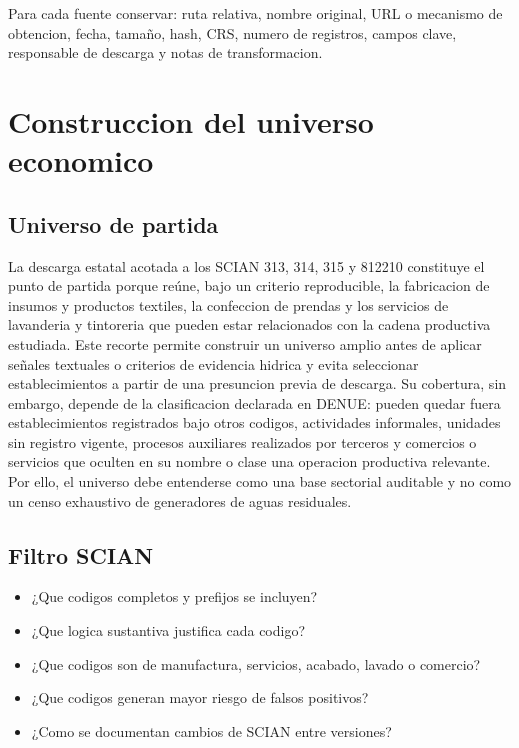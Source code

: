 \documentclass[11pt,letterpaper]{article}
\begin{document}
\begin{trazabilidad}
Para cada fuente conservar: ruta relativa, nombre original, URL o mecanismo de obtencion, fecha, tamaño, hash, CRS, numero de registros, campos clave, responsable de descarga y notas de transformacion.
\end{trazabilidad}

\section{Construccion del universo economico}

\subsection{Universo de partida}
La descarga estatal acotada a los SCIAN 313, 314, 315 y 812210 constituye el punto de partida porque reúne, bajo un criterio reproducible, la fabricacion de insumos y productos textiles, la confeccion de prendas y los servicios de lavanderia y tintoreria que pueden estar relacionados con la cadena productiva estudiada. Este recorte permite construir un universo amplio antes de aplicar señales textuales o criterios de evidencia hidrica y evita seleccionar establecimientos a partir de una presuncion previa de descarga. Su cobertura, sin embargo, depende de la clasificacion declarada en DENUE: pueden quedar fuera establecimientos registrados bajo otros codigos, actividades informales, unidades sin registro vigente, procesos auxiliares realizados por terceros y comercios o servicios que oculten en su nombre o clase una operacion productiva relevante. Por ello, el universo debe entenderse como una base sectorial auditable y no como un censo exhaustivo de generadores de aguas residuales.

\subsection{Filtro SCIAN}
\begin{preguntas}
\begin{itemize}
    \item ¿Que codigos completos y prefijos se incluyen?
    \item ¿Que logica sustantiva justifica cada codigo?
    \item ¿Que codigos son de manufactura, servicios, acabado, lavado o comercio?
    \item ¿Que codigos generan mayor riesgo de falsos positivos?
    \item ¿Como se documentan cambios de SCIAN entre versiones?
\end{itemize}
\end{preguntas}
\end{document}
